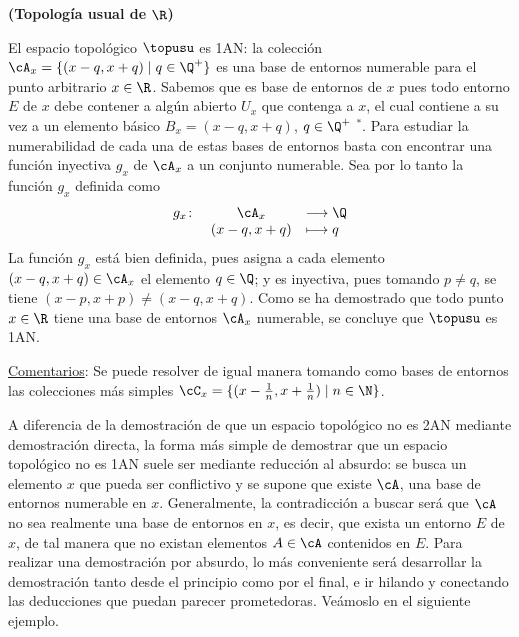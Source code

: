 \begin{ej}
    {\bf (Topología usual de $\R$)} 
    \item El espacio topológico $\topusu$ es 1AN: la colección $\cA_x = \{(x-q,x+q) \mid q \in \Q^+\}$ es una base de entornos numerable para el punto arbitrario $x\in \R$. Sabemos que es base de entornos de $x$ pues todo entorno $E$ de $x$ debe contener a algún abierto $U_x$ que contenga a $x$, el cual contiene a su vez a un elemento básico $B_x = (x-q,x+q)$, $q \in \Q^+$ \hyperlink{Base reales usual}{ $^*$}. Para estudiar la numerabilidad de cada una de estas bases de entornos basta con encontrar una función inyectiva $g_x$ de $\cA_x$ a un conjunto numerable. Sea por lo tanto la función $g_x$ definida como
    \[
    \begin{array}{rcl}
        g_x \colon & \cA_x  & \longrightarrow \Q\\
                & (x-q,x+q) & \longmapsto     q
    \end{array}
    \]
    La función $g_x$ está bien definida, pues asigna a cada elemento $(x-q,x+q)\in\cA_x$ el elemento $q\in\Q$; y es inyectiva, pues tomando $p\neq q$, se tiene $(x-p,x+p) \neq (x-q,x+q)$. Como se ha demostrado que todo punto $x\in\R$ tiene una base de entornos $\cA_x$ numerable, se concluye que $\topusu$ es 1AN.

    \medskip

    \underline{Comentarios}:
    Se puede resolver de igual manera tomando como bases de entornos las colecciones más simples $\cC_x = \{(x-\frac1n,x+\frac1n) \mid n \in \N\}$.
\end{ej}

\bigskip

A diferencia de la demostración de que un espacio topológico no es 2AN mediante demostración directa, la forma más simple de demostrar que un espacio topológico no es 1AN suele ser mediante reducción al absurdo: se busca un elemento $x$ que pueda ser conflictivo y se supone que existe $\cA$, una base de entornos numerable en $x$. Generalmente, la contradicción a buscar será que $\cA$ no sea realmente una base de entornos en $x$, es decir, que exista un entorno $E$ de $x$, de tal manera que no existan elementos $A\in\cA$ contenidos en $E$. Para realizar una demostración por absurdo, lo más conveniente será desarrollar la demostración tanto desde el principio como por el final, e ir hilando y conectando las deducciones que puedan parecer prometedoras. Veámoslo en el siguiente ejemplo.

